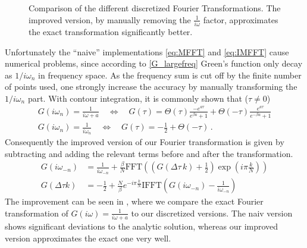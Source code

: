 \begin{appendix}
\begin{figure}[h]
	\caption{Comparison of the different discretized Fourier Transformations. The improved version, by manually removing the $\frac{1}{i \omega}$ factor, approximates the exact transformation significantly better. }
	\label{fig:fourier_traf}
\end{figure}

Unfortunately the ``naive'' implementations \eqref{eq:MFFT} and \eqref{eq:IMFFT} cause numerical problems, since according to \eqref{G_largefreq} Green's function only decay as $1/ i\omega_n$ in frequency space. As the frequency sum is cut off by the finite number of points used, one strongly increase the accuracy by manually transforming the $1/ i\omega_n$ part. With contour integration, it is commonly shown that ($\tau \neq 0$)
%
\begin{gather}
G(i\omega_n) = \frac{1}{i\omega + a}
\quad \Leftrightarrow \quad
G(\tau) = \Theta(\tau) \frac{- e^{a \tau}}{e^{\beta a}+1} + \Theta(-\tau) \frac{e^{a \tau}}{e^{-\beta a}+1} 
\\
	G(i ω_n) =\frac{1}{i ω_n} \quad ⇔ \quad G(τ)=-\frac{1}{2} + \Theta(-\tau)
	\label{eq:ff_pair}
\, .
\end{gather}
Consequently the improved version of our Fourier transformation is given by subtracting and adding the relevant terms before and after the transformation.
\begin{align}
	G(i ω_{-n})&= \frac{1}{i ω_{-n}}+\frac{\beta}{N} \mathrm{FFT}\left( \left(G(\Delta τ \, k)+\frac{1}{2}\right)\exp{\left(i π \frac{k}{N}\right)}\right)\\
	G(\Delta τ k)&= -\frac{1}{2}+\frac{N}{β} e^{-i π \frac{k}{N}}\mathrm{IFFT}\left(G(iω_{-n})-\frac{1}{i ω_{-n}}\right)
	\label{eq:improved_fft}
\end{align}
The improvement can be seen in , where we compare the exact Fourier transformation of $G(i ω)=\frac{1}{iω+a}$ to our discretized versions. The naiv version shows significant deviations to the analytic solution, whereas our improved version approximates the exact one very well.  



\end{appendix}
